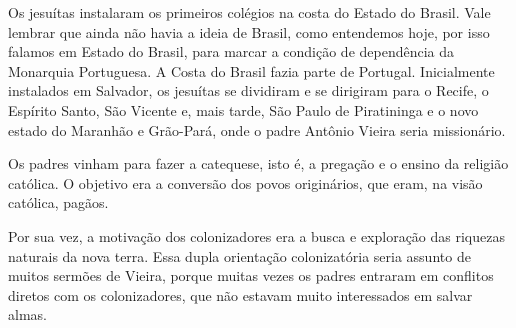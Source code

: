 Os jesuítas instalaram os primeiros colégios na costa do Estado do
Brasil. Vale lembrar que ainda não havia a ideia de Brasil, como
entendemos hoje, por isso falamos em Estado do Brasil, para marcar a
condição de dependência da Monarquia Portuguesa. A Costa do Brasil fazia
parte de Portugal. Inicialmente instalados em Salvador, os jesuítas se
dividiram e se dirigiram para o Recife, o Espírito Santo, São Vicente e,
mais tarde, São Paulo de Piratininga e o novo estado do Maranhão e
Grão-Pará, onde o padre Antônio Vieira seria missionário.

Os padres vinham para fazer a catequese, isto é, a pregação e o ensino
da religião católica. O objetivo era a conversão dos povos originários,
que eram, na visão católica, pagãos.

Por sua vez, a motivação dos colonizadores era a busca e exploração das
riquezas naturais da nova terra. Essa dupla orientação colonizatória
seria assunto de muitos sermões de Vieira, porque muitas vezes os padres
entraram em conflitos diretos com os colonizadores, que não estavam
muito interessados em salvar almas.